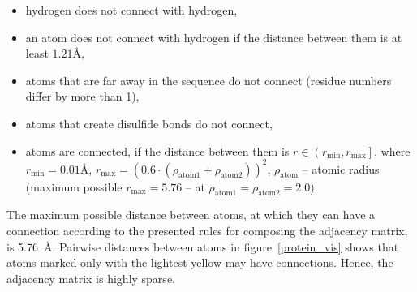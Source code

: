 \documentclass[12pt,twosides]{extarticle}
\begin{document}
\begin{itemize}
	\item hydrogen does not connect with hydrogen,
	\item an atom does not connect with hydrogen if the distance between them is at least $1.21$\AA,
	\item atoms that are far away in the sequence do not connect (residue numbers differ by more than 1),
	\item atoms that create disulfide bonds do not connect,
	\item atoms are connected, if the distance between them is $r\in \left(r_\text{min}, r_\text{max}\right]$, where $r_\text{min} = 0.01$\AA, $r_\text{max} = \left(0.6\cdot(\rho_\text{atom1}+\rho_\text{atom2})\right)^2$, $\rho_\text{atom}$ -- atomic radius (maximum possible $r_\text{max} = 5.76$ -- at $\rho_\text{atom1} = \rho_\text{atom2} = 2.0$).
\end{itemize}

The maximum possible distance between atoms, at which they can have a connection according to the presented rules for composing the adjacency matrix, is 5.76~\AA. Pairwise distances between atoms in figure~\ref{protein_vis} shows that atoms marked only with the lightest yellow may have connections. Hence, the adjacency matrix is highly sparse.
\end{document}
